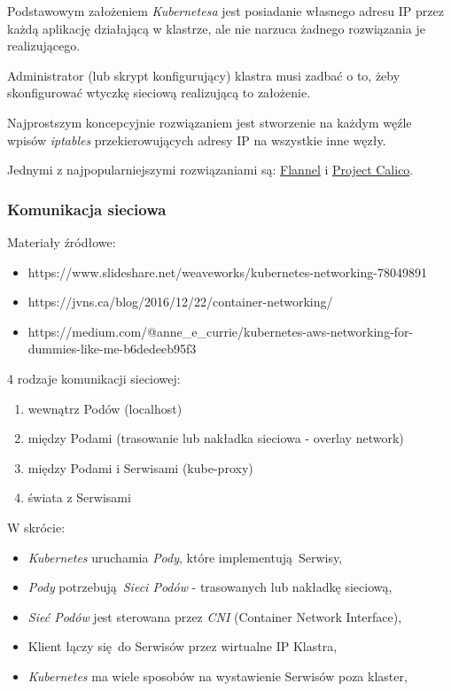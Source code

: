 \documentclass[a4paper,12pt,twoside,openany]{report}
\providecommand{\tightlist}{%
  \setlength{\itemsep}{0pt}\setlength{\parskip}{0pt}}
\begin{document}
Podstawowym założeniem \emph{Kubernetesa} jest posiadanie własnego
adresu IP przez każdą aplikację działającą w klastrze, ale nie narzuca
żadnego rozwiązania je realizującego.

Administrator (lub skrypt konfigurujący) klastra musi zadbać o to, żeby
skonfigurować wtyczkę sieciową realizującą to założenie.

Najprostszym koncepcyjnie rozwiązaniem jest stworzenie na każdym węźle
wpisów \emph{iptables} przekierowujących adresy IP na wszystkie inne
węzły.

Jednymi z najpopularniejszymi rozwiązaniami są:
\href{https://github.com/coreos/flannel\#flannel}{Flannel} i
\href{https://www.projectcalico.org/}{Project Calico}.

\hypertarget{komunikacja-sieciowa}{%
\subsubsection{Komunikacja sieciowa}\label{komunikacja-sieciowa}}

Materiały źródłowe:

\begin{itemize}
\tightlist
\item
  https://www.slideshare.net/weaveworks/kubernetes-networking-78049891
\item
  https://jvns.ca/blog/2016/12/22/container-networking/
\item
  https://medium.com/@anne\_e\_currie/kubernetes-aws-networking-for-dummies-like-me-b6dedeeb95f3
\end{itemize}

4 rodzaje komunikacji sieciowej:

\begin{enumerate}
\def\labelenumi{\arabic{enumi}.}
\tightlist
\item
  wewnątrz Podów (localhost)
\item
  między Podami (trasowanie lub nakładka sieciowa - overlay network)
\item
  między Podami i Serwisami (kube-proxy)
\item
  świata z Serwisami
\end{enumerate}

W skrócie:

\begin{itemize}
\tightlist
\item
  \emph{Kubernetes} uruchamia \emph{Pody}, które implementują~Serwisy,
\item
  \emph{Pody} potrzebują~\emph{Sieci Podów} - trasowanych lub nakładkę
  sieciową,
\item
  \emph{Sieć Podów} jest sterowana przez \emph{CNI} (Container Network
  Interface),
\item
  Klient łączy się~do Serwisów przez wirtualne IP Klastra,
\item
  \emph{Kubernetes} ma wiele sposobów na wystawienie Serwisów poza
  klaster,
\end{itemize}
\end{document}
